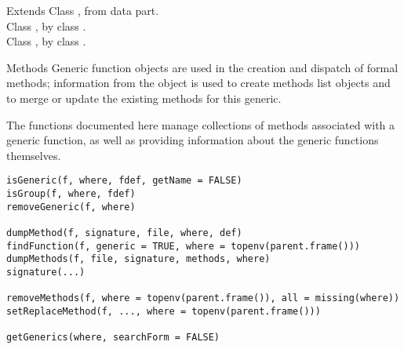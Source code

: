 %
\begin{Section}{Extends}
Class , from data part.\\{}
Class , by class .\\{}
Class , by class .
\end{Section}
%
\begin{Section}{Methods}
Generic function objects are used in the creation and dispatch of
formal methods; information from the object is used to create methods
list objects and to merge or update the existing methods for this
generic.
\end{Section}
%
\begin{Description}\relax
The functions documented here manage collections of methods associated
with a generic function, as well as providing information about the
generic functions themselves.
\end{Description}
%
\begin{Usage}
\begin{verbatim}
isGeneric(f, where, fdef, getName = FALSE)
isGroup(f, where, fdef)
removeGeneric(f, where)

dumpMethod(f, signature, file, where, def)
findFunction(f, generic = TRUE, where = topenv(parent.frame()))
dumpMethods(f, file, signature, methods, where)
signature(...)

removeMethods(f, where = topenv(parent.frame()), all = missing(where))
setReplaceMethod(f, ..., where = topenv(parent.frame()))

getGenerics(where, searchForm = FALSE)
\end{verbatim}
\end{Usage}
%
